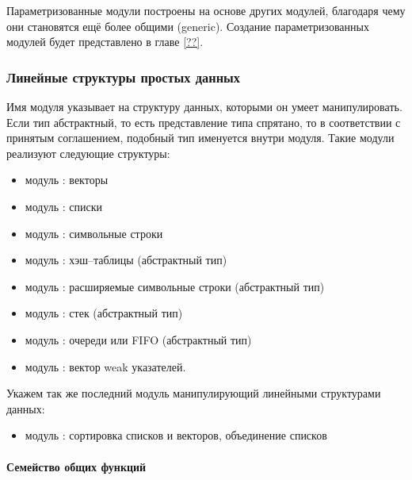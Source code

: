 Параметризованные модули построены на основе других модулей, благодаря чему они 
становятся ещё более общими (generic). Создание параметризованных модулей будет 
представлено в главе \ref{??}.

\subsubsection{Линейные структуры простых данных}
\label{subsubsec:simple_linear_data_structures}

Имя модуля указывает на структуру данных, которыми он умеет манипулировать. Если 
тип абстрактный, то есть представление типа спрятано, то в соответствии с 
принятым соглашением, подобный тип именуется  внутри модуля. Такие 
модули реализуют следующие структуры: 

\begin{itemize}
	\item модуль : векторы

	\item модуль : списки

	\item модуль : символьные строки

	\item модуль : хэш--таблицы (абстрактный тип)

	\item модуль : расширяемые символьные строки (абстрактный тип)

	\item модуль : стек (абстрактный тип)

	\item модуль : очереди или FIFO (абстрактный тип)

	\item модуль : вектор weak указателей.
\end{itemize}


Укажем так же последний модуль манипулирующий линейными структурами данных:

\begin{itemize}
	\item модуль : сортировка списков и векторов, объединение списков
\end{itemize}

\paragraph{Семейство общих функций}


